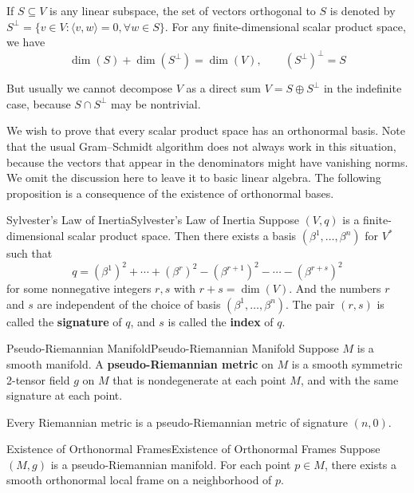 \documentclass[../main.tex]{subfiles}
\begin{document}
If $S \subseteq V$ is any linear subspace, the set of vectors orthogonal to $S$ is denoted by $S^\perp = \{v \in V : \langle v, w \rangle = 0, \forall w \in S\}$. For any finite-dimensional scalar product space, we have
\begin{equation}
	\dim(S) + \dim(S^\perp) = \dim(V), \qquad (S^\perp)^\perp = S
\end{equation}
\begin{remark}
	But usually we cannot decompose $V$ as a direct sum $V = S \oplus S^\perp$ in the indefinite case, because $S \cap S^\perp$ may be nontrivial.
\end{remark}

We wish to prove that every scalar product space has an orthonormal basis. Note that the usual Gram–Schmidt algorithm does not always work in this situation, because the vectors that appear in the denominators might have vanishing norms. We omit the discussion here to leave it to basic linear algebra. The following proposition is a consequence of the existence of orthonormal bases.

\begin{proposition}{Sylvester's Law of Inertia}{Sylvester's Law of Inertia}
	Suppose $(V, q)$ is a finite-dimensional scalar product space. Then there exists a basis $(\beta^1, \ldots, \beta^n)$ for $V^*$ such that
	\begin{equation}
		q = (\beta^1)^2 + \cdots + (\beta^r)^2 - (\beta^{r+1})^2 - \cdots - (\beta^{r+s})^2
	\end{equation}
	for some nonnegative integers $r, s$ with $r + s = \dim(V)$. And the numbers $r$ and $s$ are independent of the choice of basis $(\beta^1, \ldots, \beta^n)$. The pair $(r, s)$ is called the \textbf{signature} of $q$, and $s$ is called the \textbf{index} of $q$.
\end{proposition}

\begin{definition}{Pseudo-Riemannian Manifold}{Pseudo-Riemannian Manifold}
	Suppose $M$ is a smooth manifold. A \textbf{pseudo-Riemannian metric} on $M$ is a smooth symmetric 2-tensor field $g$ on $M$ that is nondegenerate at each point $M$, and with the same signature at each point.
\end{definition}
Every Riemannian metric is a pseudo-Riemannian metric of signature $(n, 0)$.

\begin{proposition}{Existence of Orthonormal Frames}{Existence of Orthonormal Frames}
	Suppose $(M, g)$ is a pseudo-Riemannian manifold. For each point $p \in M$, there exists a smooth orthonormal local frame on a neighborhood of $p$.
\end{proposition}
\end{document}
